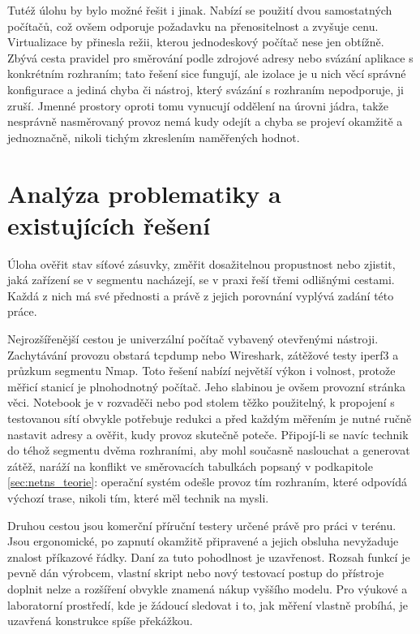 Tutéž úlohu by bylo možné řešit i jinak. Nabízí se použití dvou samostatných počítačů, což ovšem odporuje požadavku na přenositelnost a zvyšuje cenu. Virtualizace by přinesla režii, kterou jednodeskový počítač nese jen obtížně. Zbývá cesta pravidel pro směrování podle zdrojové adresy nebo svázání aplikace s konkrétním rozhraním; tato řešení sice fungují, ale izolace je u nich věcí správné konfigurace a jediná chyba či nástroj, který svázání s rozhraním nepodporuje, ji zruší. Jmenné prostory oproti tomu vynucují oddělení na úrovni jádra, takže nesprávně nasměrovaný provoz nemá kudy odejít a chyba se projeví okamžitě a jednoznačně, nikoli tichým zkreslením naměřených hodnot.

\section{Analýza problematiky a existujících řešení}
\label{sec:analyza}

Úloha ověřit stav síťové zásuvky, změřit dosažitelnou propustnost nebo zjistit, jaká zařízení se v segmentu nacházejí, se v praxi řeší třemi odlišnými cestami. Každá z nich má své přednosti a právě z jejich porovnání vyplývá zadání této práce.

Nejrozšířenější cestou je univerzální počítač vybavený otevřenými nástroji. Zachytávání provozu obstará tcpdump nebo Wireshark, zátěžové testy iperf3 a průzkum segmentu Nmap. Toto řešení nabízí největší výkon i volnost, protože měřicí stanicí je plnohodnotný počítač. Jeho slabinou je ovšem provozní stránka věci. Notebook je v rozvaděči nebo pod stolem těžko použitelný, k propojení s testovanou sítí obvykle potřebuje redukci a před každým měřením je nutné ručně nastavit adresy a ověřit, kudy provoz skutečně poteče. Připojí-li se navíc technik do téhož segmentu dvěma rozhraními, aby mohl současně naslouchat a generovat zátěž, naráží na konflikt ve směrovacích tabulkách popsaný v podkapitole \ref{sec:netns_teorie}: operační systém odešle provoz tím rozhraním, které odpovídá výchozí trase, nikoli tím, které měl technik na mysli.

Druhou cestou jsou komerční příruční testery určené právě pro práci v terénu. Jsou ergonomické, po zapnutí okamžitě připravené a jejich obsluha nevyžaduje znalost příkazové řádky. Daní za tuto pohodlnost je uzavřenost. Rozsah funkcí je pevně dán výrobcem, vlastní skript nebo nový testovací postup do přístroje doplnit nelze a rozšíření obvykle znamená nákup vyššího modelu. Pro výukové a laboratorní prostředí, kde je žádoucí sledovat i to, jak měření vlastně probíhá, je uzavřená konstrukce spíše překážkou.

